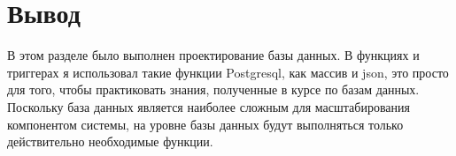 \vbox{}

\section*{Вывод}

В этом разделе было выполнен проектирование базы данных.
В функциях и триггерах я использовал такие функции Postgresql, как массив и json, это просто для того, чтобы практиковать знания, полученные в курсе по базам данных.
Поскольку база данных является наиболее сложным для масштабирования компонентом системы, на уровне базы данных будут выполняться только действительно необходимые функции.
